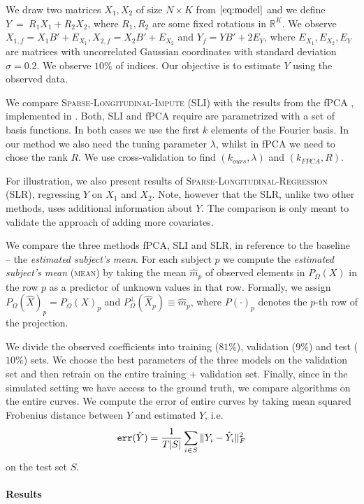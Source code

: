 \documentclass[preprint]{imsart}
\numberwithin{equation}{section}
\theoremstyle{plain}
\newcommand{\R}{\mathbb{R}}
\begin{document}
We draw two matrices $X_1,X_2$ of size $N \times K$ from $\eqref{eq:model}$ and we define $Y~=~R_1 X_1 + R_2 X_2$, where $R_1,R_2$ are some fixed rotations in $\R^K$. We observe $X_{1,f} = X_1B' + E_{X_1}, X_{2,f} = X_2 B' + E_{X_2}$ and $Y_f = YB' + 2E_Y$, where $E_{X_1},E_{X_2},E_{Y}$ are matrices with uncorrelated Gaussian coordinates with standard deviation $\sigma = 0.2$. We observe $10\%$ of indices. Our objective is to estimate $Y$ using the observed data.

We compare \textsc{Sparse-Longitudinal-Impute} (SLI) with the results from the fPCA \citep{james2000principal}, implemented in \citet{peng2009geometric}. Both, SLI and fPCA require are parametrized with a set of basis functions. In both cases we use the first $k$ elements of the Fourier basis. In our method we also need the tuning parameter $\lambda$, whilst in fPCA we need to chose the rank $R$. We use cross-validation to find $(k_{ours},\lambda)$ and $(k_{FPCA},R)$.

For illustration, we also present results of \textsc{Sparse-Longitudinal-Regression} (SLR), regressing $Y$ on $X_1$ and $X_2$. Note, however that the SLR, unlike two other methods, uses additional information about $Y$. The comparison is only meant to validate the approach of adding more covariates.

We compare the three methods fPCA, SLI and SLR, in reference to the baseline -- the {\it estimated subject's mean}. For each subject $p$ we compute the {\it estimated subject's mean} (\textsc{mean}) by taking the mean $\hat{m}_p$ of observed elements in $P_\Omega(X)$ in the row $p$ as a predictor of unknown values in that row. Formally, we assign $P_\Omega(\hat{X})_p = P_\Omega(X)_p$ and $P^\perp_\Omega (\hat{X}_p) \equiv \hat{m}_p$, where $P(\cdot)_p$ denotes the $p$-th row of the projection.

We divide the observed coefficients into training ($81\%$), validation ($9\%$) and test ($10\%$) sets. We choose the best parameters of the three models on the validation set and then retrain on the entire training + validation set. Finally, since in the simulated setting we have access to the ground truth, we compare algorithms on the entire curves. We compute the error of entire curves by taking mean squared Frobenius distance between $Y$ and estimated $\hat{Y}$, i.e.
\[
 \verb|err|(\hat{Y}) = \frac{1}{T|S|} \sum_{i\in S} \|Y_i - \hat{Y}_i \|_F^2
 \]
 on the test set $S$.
 
\paragraph{Results}
\end{document}
